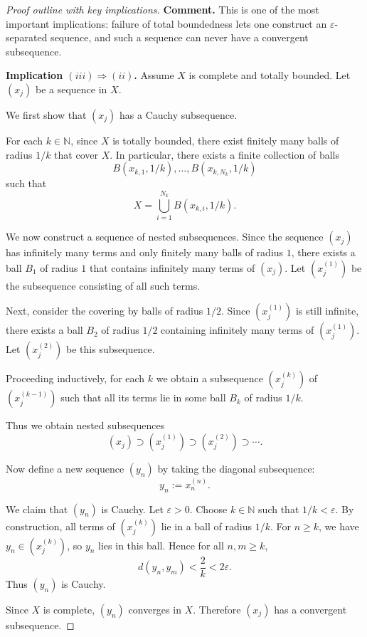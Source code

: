 \documentclass[12pt]{article}
\begin{document}
\begin{proof}[Proof outline with key implications]
\medskip

\noindent\textbf{Comment.} This is one of the most important implications: failure of total boundedness lets one construct an $\varepsilon$-separated sequence, and such a sequence can never have a convergent subsequence.

\medskip

\noindent\textbf{Implication $(iii)\Rightarrow(ii)$.}
Assume $X$ is complete and totally bounded. Let $(x_j)$ be a sequence in $X$.

We first show that $(x_j)$ has a Cauchy subsequence.

For each $k \in \mathbb{N}$, since $X$ is totally bounded, there exist finitely many balls of radius $1/k$ that cover $X$. In particular, there exists a finite collection of balls
\[
B(x_{k,1},1/k), \dots, B(x_{k,N_k},1/k)
\]
such that
\[
X = \bigcup_{i=1}^{N_k} B(x_{k,i},1/k).
\]

We now construct a sequence of nested subsequences. Since the sequence $(x_j)$ has infinitely many terms and only finitely many balls of radius $1$, there exists a ball $B_1$ of radius $1$ that contains infinitely many terms of $(x_j)$. Let $(x_j^{(1)})$ be the subsequence consisting of all such terms.

Next, consider the covering by balls of radius $1/2$. Since $(x_j^{(1)})$ is still infinite, there exists a ball $B_2$ of radius $1/2$ containing infinitely many terms of $(x_j^{(1)})$. Let $(x_j^{(2)})$ be this subsequence.

Proceeding inductively, for each $k$ we obtain a subsequence $(x_j^{(k)})$ of $(x_j^{(k-1)})$ such that all its terms lie in some ball $B_k$ of radius $1/k$.

Thus we obtain nested subsequences
\[
(x_j) \supset (x_j^{(1)}) \supset (x_j^{(2)}) \supset \cdots.
\]

Now define a new sequence $(y_n)$ by taking the diagonal subsequence:
\[
y_n := x_n^{(n)}.
\]

We claim that $(y_n)$ is Cauchy. Let $\varepsilon > 0$. Choose $k \in \mathbb{N}$ such that $1/k < \varepsilon$. By construction, all terms of $(x_j^{(k)})$ lie in a ball of radius $1/k$. For $n \ge k$, we have $y_n \in (x_j^{(k)})$, so $y_n$ lies in this ball. Hence for all $n,m \ge k$,
\[
d(y_n,y_m) < \frac{2}{k} < 2\varepsilon.
\]
Thus $(y_n)$ is Cauchy.

Since $X$ is complete, $(y_n)$ converges in $X$. Therefore $(x_j)$ has a convergent subsequence.

\medskip


\end{proof}
\end{document}
